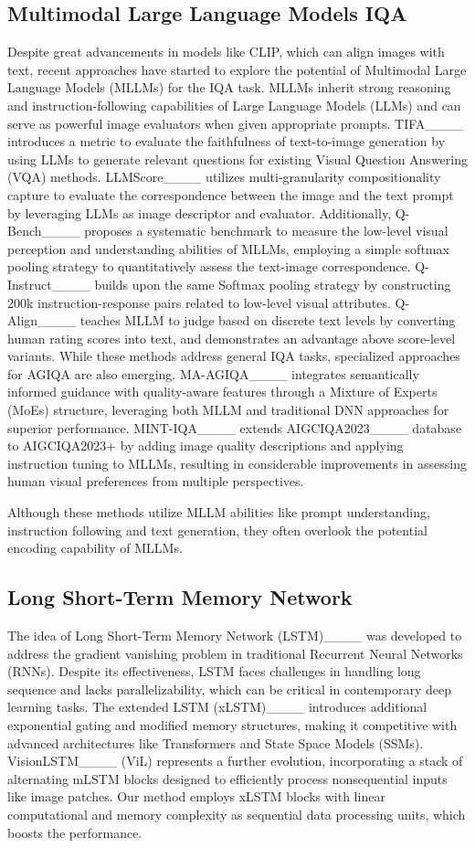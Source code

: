\subsection{Multimodal Large Language Models IQA}
Despite great advancements in models like CLIP, which can align images with text, recent approaches have started to explore the potential of Multimodal Large Language Models (MLLMs) for the IQA task.
MLLMs inherit strong reasoning and instruction-following capabilities of Large Language Models (LLMs) and can serve as powerful image evaluators when given appropriate prompts.
TIFA____ introduces a metric to evaluate the faithfulness of text-to-image generation by using LLMs to generate relevant questions for existing Visual Question Answering (VQA) methods.
LLMScore____ utilizes multi-granularity compositionality capture to evaluate the correspondence between the image and the text prompt by leveraging LLMs as image descriptor and evaluator.
Additionally, Q-Bench____ proposes a systematic benchmark to measure the low-level visual perception and understanding abilities of MLLMs, employing a simple softmax pooling strategy to quantitatively assess the text-image correspondence.
Q-Instruct____ builds upon the same Softmax pooling strategy by constructing 200k instruction-response pairs related to low-level visual attributes.
Q-Align____ teaches MLLM to judge based on discrete text levels by converting human rating scores into text, and demonstrates an advantage above score-level variants.
While these methods address general IQA tasks, specialized approaches for AGIQA are also emerging.
MA-AGIQA____ integrates semantically informed guidance with quality-aware features through a Mixture of Experts (MoEs) structure, leveraging both MLLM and traditional DNN approaches for superior performance.
MINT-IQA____ extends AIGCIQA2023____ database to AIGCIQA2023+ by adding image quality descriptions and applying instruction tuning to MLLMs, resulting in considerable improvements in assessing human visual preferences from multiple perspectives.

Although these methods utilize MLLM abilities like prompt understanding, instruction following and text generation, they often overlook the potential encoding capability of MLLMs.

\subsection{Long Short-Term Memory Network}
The idea of Long Short-Term Memory Network (LSTM)____ was developed to address the gradient vanishing problem in traditional Recurrent Neural Networks (RNNs). 
Despite its effectiveness, LSTM faces challenges in handling long sequence and lacks parallelizability, which can be critical in contemporary deep learning tasks.
The extended LSTM (xLSTM)____ introduces additional exponential gating and modified memory structures, making it competitive with advanced architectures like Transformers and State Space Models (SSMs).
VisionLSTM____ (ViL) represents a further evolution, incorporating a stack of alternating mLSTM blocks designed to efficiently process nonsequential inputs like image patches.
Our method employs xLSTM blocks with linear computational and memory complexity as sequential data processing units, which boosts the performance.
